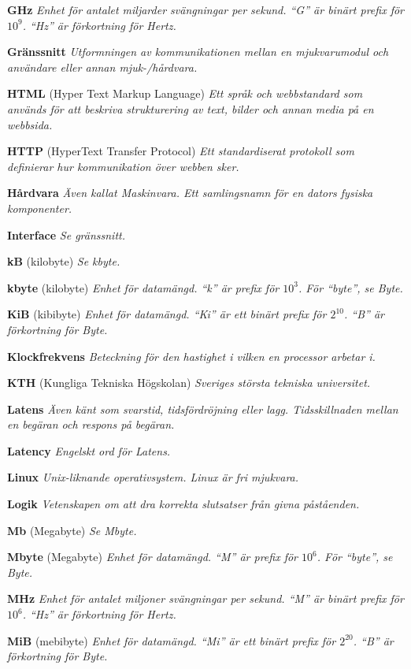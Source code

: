\documentclass[a4paper, twoside, 11pt, titlepage]{article}
\begin{document}
	\textbf{GHz} \emph{Enhet för antalet miljarder svängningar per sekund. ``G'' är binärt prefix för $10^9$. ``Hz'' är förkortning för Hertz.}

	\textbf{Gränssnitt} \emph{Utformningen av kommunikationen mellan en mjukvarumodul och användare eller annan mjuk-/hårdvara.}

	\textbf{HTML} (Hyper Text Markup Language) \emph{Ett språk och webbstandard som används för att beskriva strukturering av text, bilder och annan media på en webbsida.}

	\textbf{HTTP} (HyperText Transfer Protocol) \emph{Ett standardiserat protokoll som definierar hur kommunikation över webben sker.}

	\textbf{Hårdvara} \emph{Även kallat Maskinvara. Ett samlingsnamn för en dators fysiska komponenter.}

	\textbf{Interface} \emph{Se gränssnitt.}

	\textbf{kB} (kilobyte) \emph{Se kbyte.}

	\textbf{kbyte} (kilobyte) \emph{Enhet för datamängd. ``k'' är prefix för $10^3$. För ``byte'', se Byte.}

	\textbf{KiB} (kibibyte) \emph{Enhet för datamängd. ``Ki'' är ett binärt prefix för $2^10$. ``B'' är förkortning för Byte.}

	\textbf{Klockfrekvens} \emph{Beteckning för den hastighet i vilken en processor arbetar i.}

	\textbf{KTH} (Kungliga Tekniska Högskolan) \emph{Sveriges största tekniska universitet.}

	\textbf{Latens} \emph{Även känt som svarstid, tidsfördröjning eller lagg. Tidsskillnaden mellan en begäran och respons på begäran.}

	\textbf{Latency} \emph{Engelskt ord för Latens.}

	\textbf{Linux} \emph{Unix-liknande operativsystem. Linux är fri mjukvara.}

	\textbf{Logik} \emph{Vetenskapen om att dra korrekta slutsatser från givna påståenden.}

	\textbf{Mb} (Megabyte) \emph{Se Mbyte.}

	\textbf{Mbyte} (Megabyte) \emph{Enhet för datamängd. ``M'' är prefix för $10^6$.  För ``byte'', se Byte.}

	\textbf{MHz} \emph{Enhet för antalet miljoner svängningar per sekund. ``M'' är binärt prefix för $10^6$. ``Hz'' är förkortning för Hertz.}

	\textbf{MiB} (mebibyte) \emph{Enhet för datamängd. ``Mi'' är ett binärt prefix för $2^20$. ``B'' är förkortning för Byte.}
\end{document}
